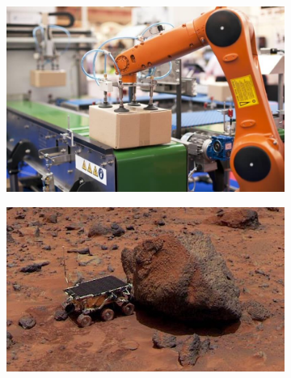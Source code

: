 \documentclass[runningheads,a4paper,12pt]{report}
\begin{document}
\begin{figure}
	\centering

  \begin{subfigure}{.49\textwidth}
  	\centering
  	\includegraphics[width=\linewidth]{./images/1_industrial_robot}
  	\caption{}
  	\label{fig:industrial}
  \end{subfigure} 
  \hfill  
  \begin{subfigure}{.46\textwidth}
  	\centering
  	\includegraphics[width=\linewidth]{./images/1_exploration_robot}\hfill
  	\caption{}
  	\label{fig:exploration}
  \end{subfigure}\par\medskip
    

\end{figure}
\end{document}
